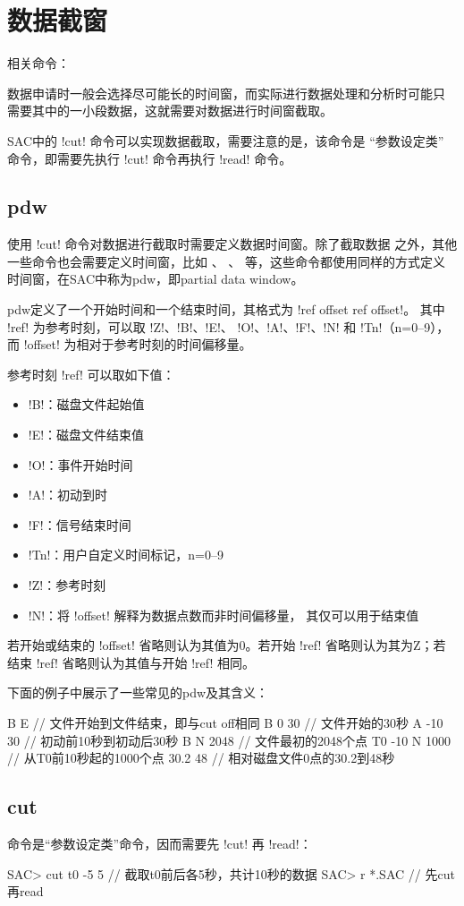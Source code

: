 \section{数据截窗}
相关命令：

数据申请时一般会选择尽可能长的时间窗，而实际进行数据处理和分析时可能只
需要其中的一小段数据，这就需要对数据进行时间窗截取。

SAC中的 !cut! 命令可以实现数据截取，需要注意的是，该命令是
``参数设定类'' 命令，即需要先执行 !cut! 命令再执行
!read! 命令。

\subsection{pdw}
\label{subsec:pdw}
使用 !cut! 命令对数据进行截取时需要定义数据时间窗。除了截取数据
之外，其他一些命令也会需要定义时间窗，比如 、
、 等，这些命令都使用同样的方式定义
时间窗，在SAC中称为pdw，即partial data window。

pdw定义了一个开始时间和一个结束时间，其格式为 !ref offset ref offset!。
其中 !ref! 为参考时刻，可以取 !Z!、!B!、!E!、
!O!、!A!、!F!、!N! 和 !Tn!（n=0--9），
而 !offset! 为相对于参考时刻的时间偏移量。

参考时刻 !ref! 可以取如下值：
\begin{itemize}
\item !B!：磁盘文件起始值
\item !E!：磁盘文件结束值
\item !O!：事件开始时间
\item !A!：初动到时
\item !F!：信号结束时间
\item !Tn!：用户自定义时间标记，n=0--9
\item !Z!：参考时刻
\item !N!：将 !offset! 解释为数据点数而非时间偏移量，
    其仅可以用于结束值
\end{itemize}

若开始或结束的 !offset! 省略则认为其值为0。若开始 !ref!
省略则认为其为Z；若结束 !ref! 省略则认为其值与开始 !ref!
相同。

下面的例子中展示了一些常见的pdw及其含义：
\begin{SACCode}
 B E            // 文件开始到文件结束，即与cut off相同
 B 0 30         // 文件开始的30秒
 A -10 30       // 初动前10秒到初动后30秒
 B N 2048       // 文件最初的2048个点
 T0 -10 N 1000  // 从T0前10秒起的1000个点
 30.2 48        // 相对磁盘文件0点的30.2到48秒
\end{SACCode}

\subsection{cut}
 命令是``参数设定类''命令，因而需要先 !cut! 再
!read!：
\begin{SACCode}
SAC> cut t0 -5 5        // 截取t0前后各5秒，共计10秒的数据
SAC> r *.SAC            // 先cut再read
\end{SACCode}

